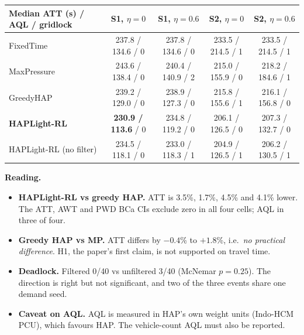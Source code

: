 \documentclass[11pt,a4paper]{article}
\begin{document}
\begin{center}\small
\begin{tabular}{@{}lcccc@{}}
\toprule
Median ATT (s) / AQL / gridlock & S1, $\eta=0$ & S1, $\eta=0.6$ & S2, $\eta=0$ & S2, $\eta=0.6$ \\
\midrule
FixedTime            & 237.8 / 134.6 / 0 & 237.8 / 134.6 / 0 & 233.5 / 214.5 / 1 & 233.5 / 214.5 / 1 \\
MaxPressure          & 243.6 / 138.4 / 0 & 240.4 / 140.9 / 2 & 215.0 / 155.9 / 0 & 218.2 / 184.6 / 1 \\
GreedyHAP            & 239.2 / 129.0 / 0 & 238.9 / 127.3 / 0 & 215.8 / 155.6 / 1 & 216.1 / 156.8 / 0 \\
\textbf{HAPLight-RL} & \textbf{230.9 / 113.6} / 0 & 234.8 / 119.2 / 0 & 206.1 / 126.5 / 0 & 207.3 / 132.7 / 0 \\
HAPLight-RL (no filter) & 234.5 / 118.1 / 0 & 233.0 / 118.3 / 1 & 204.9 / 126.5 / 1 & 206.2 / 130.5 / 1 \\
\bottomrule
\end{tabular}
\end{center}

\noindent\textbf{Reading.}
\begin{itemize}
\item \textbf{HAPLight-RL vs greedy HAP.} ATT is 3.5\%, 1.7\%, 4.5\% and 4.1\% lower. The
      ATT, AWT and PWD BCa CIs exclude zero in all four cells; AQL in three of four.
\item \textbf{Greedy HAP vs MP.} ATT differs by $-0.4$\% to $+1.8$\%, i.e.\ \emph{no
      practical difference}. H1, the paper's first claim, is not supported on travel time.
\item \textbf{Deadlock.} Filtered 0/40 vs unfiltered 3/40 (McNemar $p=0.25$). The direction
      is right but not significant, and two of the three events share one demand seed.
\item \textbf{Caveat on AQL.} AQL is measured in HAP's own weight units (Indo-HCM PCU), which
      favours HAP. The vehicle-count AQL must also be reported.
\end{itemize}
\end{document}
